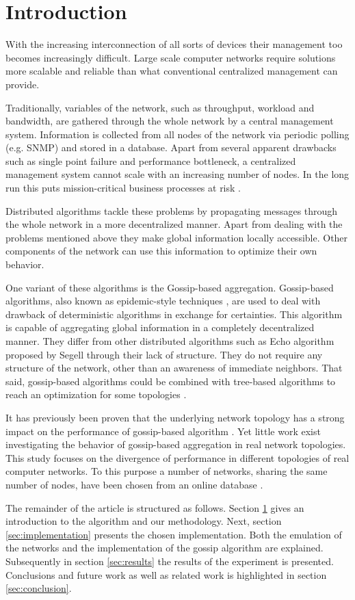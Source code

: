 \section{Introduction}
\label{sec:theory}
With the increasing interconnection of all sorts of devices their management too becomes increasingly difficult. Large scale computer networks require solutions more scalable and reliable than what conventional centralized management can provide.

Traditionally, variables of the network, such as throughput, workload and bandwidth, are gathered through the whole network by a central management system. Information is collected from all nodes of the network via periodic polling (e.g. SNMP) and stored in a database. Apart from several apparent drawbacks such as single point failure and performance bottleneck, a centralized management system cannot scale with an increasing number of nodes. In the long run this puts mission-critical business processes at risk \cite{Stadler529980}.

Distributed algorithms tackle these problems by propagating messages through the whole network in a more decentralized manner. Apart from dealing with the problems mentioned above they make global information locally accessible. Other components of the network can use this information to optimize their own behavior\cite{jelasity_gossip-based_2005}.

One variant of these algorithms is the Gossip-based aggregation. Gossip-based algorithms, also known as epidemic-style techniques \cite{I.Gupta2006}, are used to deal with drawback of deterministic algorithms in exchange for certainties. This algorithm is capable of aggregating global information in a completely decentralized manner. They differ from other distributed algorithms such as Echo algorithm proposed by Segell \cite{SegallG89} through their lack of structure. They do not require any structure of the network, other than an awareness of immediate neighbors. That said, gossip-based algorithms could be combined with tree-based algorithms to reach an optimization for some topologies \cite{KyasanurCG06}.

It has previously been proven that the underlying network topology has a strong impact on the performance of gossip-based algorithm \cite{5929538}\cite{jelasity_gossip-based_2005}. Yet little work exist investigating the behavior of gossip-based aggregation in real network topologies. This study focuses on the divergence of performance in different topologies of real computer networks. To this purpose a number of networks, sharing the same number of nodes, have been chosen from an online database \cite{knight_internet_2011}.

The remainder of the article is structured as follows. Section \ref{sec:theory} gives an introduction to the algorithm and our methodology. Next, section \ref{sec:implementation} presents the chosen implementation. Both the emulation of the networks and the implementation of the gossip algorithm are explained. Subsequently in section \ref{sec:results} the results of the experiment is presented. Conclusions and future work as well as related work is highlighted in section \ref{sec:conclusion}.
